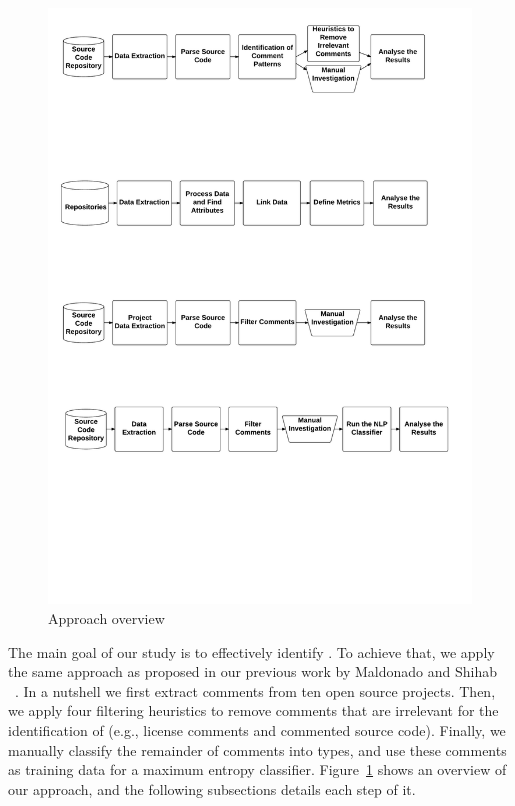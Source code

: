 \begin{figure}[thb!]
  \centering
  \includegraphics[width=1\textwidth]{figures/approach.pdf}
  \caption{Approach overview}
  \label{fig:approach}
\end{figure}

The main goal of our study is to effectively identify \SATD. To achieve that, we apply the same approach as proposed in our previous work by Maldonado and Shihab ~\cite{Maldonado2015MTD}. In a nutshell we first extract comments from ten open source projects. Then, we apply four filtering heuristics to remove comments that are irrelevant for the identification of \SATD  (e.g., license comments and commented source code). Finally, we manually classify the remainder of comments into \SATD types, and use these comments as training data for a maximum entropy classifier. Figure~\ref{fig:approach} shows an overview of our approach, and the following subsections details each step of it.
   
